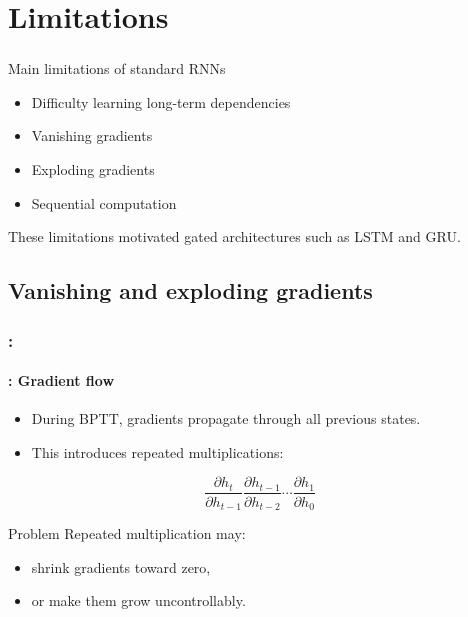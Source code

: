 \documentclass[xcolor=table]{beamer}
\begin{document}
\section{Limitations}

\begin{frame}
	\frametitle{\insertshortsubtitle}
	\framesubtitle{\insertsection}
	
	\begin{alertblock}{Main limitations of standard RNNs}
		\begin{itemize}
			\item Difficulty learning long-term dependencies
			\item Vanishing gradients
			\item Exploding gradients
			\item Sequential computation
		\end{itemize}
	\end{alertblock}
	
	\vspace{0.4cm}
	
	\begin{center}
		These limitations motivated gated architectures such as LSTM and GRU.
	\end{center}
	
\end{frame}

\subsection{Vanishing and exploding gradients}

\begin{frame}
	\frametitle{\insertshortsubtitle: \insertsection}
	\framesubtitle{\insertsubsection: Gradient flow}
	
	\begin{itemize}
		\item During BPTT, gradients propagate through all previous states.
		\item This introduces repeated multiplications:
	\end{itemize}
	
	\vspace{0.2cm}
	
	\[
	\frac{\partial h_t}{\partial h_{t-1}}
	\frac{\partial h_{t-1}}{\partial h_{t-2}}
	\cdots
	\frac{\partial h_1}{\partial h_0}
	\]
	
	\vspace{0.3cm}
	
	\begin{block}{Problem}
		Repeated multiplication may:
		\begin{itemize}
			\item shrink gradients toward zero,
			\item or make them grow uncontrollably.
		\end{itemize}
	\end{block}
	
\end{frame}
\end{document}
